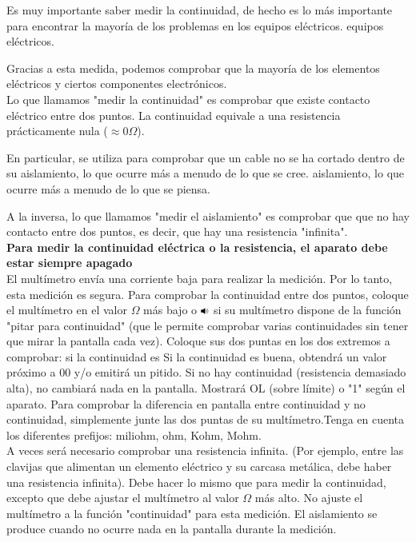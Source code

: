 \documentclass[a5paper,twoside,openany]{book}
\newcommand\vcent[1]{\vcenter{\hbox{#1}}}
\newcommand\loudspeaker[1][3]{\ensuremath{\vcent{\rule{.6ex}{.6ex}}\kern-.5ex%
  \vcent{\scalebox{.6}[1]{\rotatebox[origin=center]{90}{$\blacktriangle$}}}%
  \ifnum#1>0\relax\kern.1ex\vcent{\scalebox{.3}{)}}\ifnum#1>1\relax\kern-.15ex%
  \vcent{\scalebox{.4}{)}}\ifnum#1>2\relax\kern-.23ex\vcent{\scalebox{.5}{)}}%
  \fi\fi\fi}%
}
\begin{document}
Es muy importante saber medir la continuidad, de hecho es lo más importante
para encontrar la mayoría de los problemas en los equipos eléctricos.
equipos eléctricos.

Gracias a esta medida, podemos comprobar que la mayoría de los elementos eléctricos y ciertos componentes electrónicos.\\

Lo que llamamos "medir la continuidad" es comprobar que existe contacto eléctrico entre dos puntos.
La continuidad equivale a una resistencia prácticamente nula ($\approx$0$\Omega$).

En particular, se utiliza para comprobar que un cable no se ha cortado dentro de su aislamiento, lo que ocurre más a menudo de lo que se cree.
aislamiento, lo que ocurre más a menudo de lo que se piensa.

A la inversa, lo que llamamos "medir el aislamiento" es comprobar que
que no hay contacto entre dos puntos, es decir, que hay una resistencia "infinita".\\

\textbf{
Para medir la continuidad eléctrica o la resistencia, el aparato debe
estar siempre apagado}\\

El multímetro envía una corriente baja para realizar la medición.
Por lo tanto, esta medición es segura. Para comprobar la continuidad entre dos puntos, coloque el multímetro en el valor $\Omega$ más bajo o {\Large \loudspeaker}  si su multímetro dispone de la función "pitar para continuidad" (que le permite comprobar varias continuidades sin tener que mirar la pantalla cada vez).
Coloque sus dos puntas en los dos extremos a comprobar: si la continuidad es
Si la continuidad es buena, obtendrá un valor próximo a 00 y/o emitirá un pitido. Si no hay continuidad (resistencia demasiado alta), no cambiará nada en la pantalla. Mostrará OL (sobre límite) o "1" según el aparato.
Para comprobar la diferencia en pantalla entre continuidad y no continuidad, simplemente junte las dos puntas de su multímetro.Tenga en cuenta los diferentes prefijos: miliohm, ohm, Kohm, Mohm.\\

A veces será necesario comprobar una resistencia infinita.
(Por ejemplo, entre las clavijas que alimentan un elemento eléctrico y su carcasa metálica, debe haber una resistencia infinita).
Debe hacer lo mismo que para medir la continuidad, excepto que debe ajustar el multímetro al valor $\Omega$ más alto. No ajuste el multímetro a la función "continuidad" para esta medición.
El aislamiento se produce cuando no ocurre nada en la pantalla durante la medición.
\newpage
\end{document}
